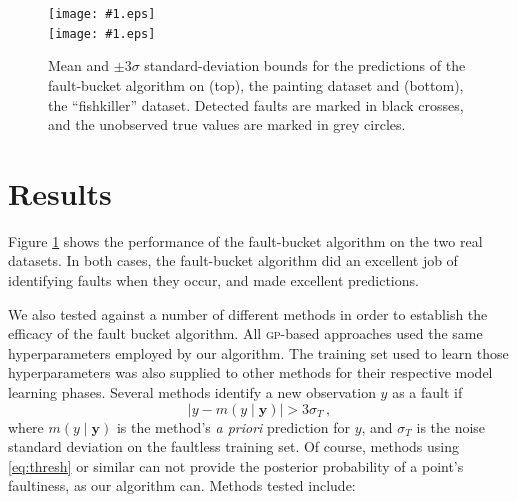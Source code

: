 \documentclass{article}
\newcommand{\psff}[1]{\texttt{[image: \#1.eps]}}
\newcommand{\given}{\ensuremath{\mid}}
\newcommand{\bm}[1]{\ensuremath{\mathbf{#1}}}
\newcommand{\acro}[1]{\textsc{#1}}
\newcommand{\vect}[1]{\bm{#1}}
\newcommand{\vy}{\vect{y}}
\newcommand{\mean}[2]{{m}(#1\given#2)}
\begin{document}

\begin{figure}
  \centering
  \small
  \psff{painting} \\
  \psff{fishkiller}
  \caption{Mean and $\pm3\sigma$ standard-deviation bounds for the
    predictions of the fault-bucket algorithm on (top), the painting
    dataset and (bottom), the ``fishkiller'' dataset.  Detected faults are
    marked in black crosses, and the unobserved true values are marked
    in grey circles.}
  \label{justfb}
\end{figure}


\section{Results}
Figure \ref{justfb} shows the performance of the fault-bucket
algorithm on the two real datasets.  In both cases, the fault-bucket
algorithm did an excellent job of identifying faults when they occur,
and made excellent predictions.  

We also tested against a number of different methods in order to establish the efficacy of the fault bucket algorithm. All \acro{gp}-based approaches used the same hyperparameters employed by our algorithm. The training set used to learn those hyperparameters was also supplied to other methods for their respective model learning phases. Several methods identify a new observation $y$ as a fault if
\begin{equation}\label{eq:thresh}
 \bigl\lvert y-\mean{y}{\vy} \bigr\rvert > 3\sigma_T\,,
\end{equation}
where $\mean{y}{\vy}$ is the method's \emph{a priori} prediction for $y$, and $\sigma_T$ is the noise standard deviation on the faultless training set. Of course, methods using \eqref{eq:thresh} or similar can not provide the posterior probability of a point's faultiness, as our algorithm can. Methods tested include:
\end{document}

